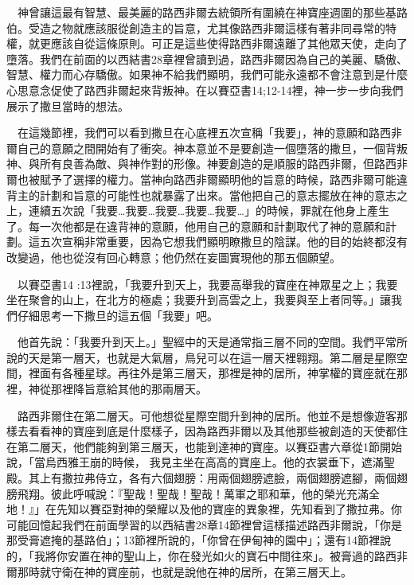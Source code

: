 \documentclass{book}
\begin{document}
\begin{center}
\noindent{}
\end{center}

　神曾讓這最有智慧、最美麗的路西非爾去統領所有圍繞在神寶座週圍的那些基路伯。受造之物就應該服從創造主的旨意，尤其像路西非爾這樣有著非同尋常的特權，就更應該自從這條原則。可正是這些使得路西非爾遠離了其他眾天使，走向了墮落。我們在前面的以西結書28章裡曾讀到過，路西非爾因為自己的美麗、驕傲、智慧、權力而心存驕傲。如果神不給我們顯明，我們可能永遠都不會注意到是什麼心思意念促使了路西非爾起來背叛神。在以賽亞書14;12-14裡，神一步一步向我們展示了撒旦當時的想法。

　在這幾節裡，我們可以看到撒旦在心底裡五次宣稱「我要」，神的意願和路西非爾自己的意願之間開始有了衝突。神本意並不是要創造一個墮落的撒旦，一個背叛神、與所有良善為敵、與神作對的形像。神要創造的是順服的路西非爾，但路西非爾也被賦予了選擇的權力。當神向路西非爾顯明他的旨意的時候，路西非爾可能違背主的計劃和旨意的可能性也就暴露了出來。當他把自己的意志擺放在神的意志之上，連續五次說「我要…我要…我要…我要…我要…」的時候，罪就在他身上產生了。每一次他都是在違背神的意願，他用自己的意願和計劃取代了神的意願和計劃。這五次宣稱非常重要，因為它想我們顯明瞭撒旦的陰謀。他的目的始終都沒有改變過，他也從沒有回心轉意；他仍然在妄圖實現他的那五個願望。

　以賽亞書14 :13裡說，「我要升到天上，我要高舉我的寶座在神眾星之上；我要坐在聚會的山上，在北方的極處；我要升到高雲之上，我要與至上者同等。」讓我們仔細思考一下撒旦的這五個「我要」吧。

　他首先說：「我要升到天上。」聖經中的天是通常指三層不同的空間。我們平常所說的天是第一層天，也就是大氣層，鳥兒可以在這一層天裡翱翔。第二層是星際空間，裡面有各種星球。再往外是第三層天，那裡是神的居所，神掌權的寶座就在那裡，神從那裡降旨意給其他的那兩層天。

　路西非爾住在第二層天。可他想從星際空間升到神的居所。他並不是想像遊客那樣去看看神的寶座到底是什麼樣子，因為路西非爾以及其他那些被創造的天使都住在第二層天，他們能夠到第三層天，也能到達神的寶座。以賽亞書六章從1節開始說，「當烏西雅王崩的時候， 我見主坐在高高的寶座上。他的衣裳垂下，遮滿聖殿。其上有撒拉弗侍立，各有六個翅膀：用兩個翅膀遮臉，兩個翅膀遮腳，兩個翅膀飛翔。彼此呼喊說：『聖哉！聖哉！聖哉！萬軍之耶和華，他的榮光充滿全地！』」在先知以賽亞對神的榮耀以及他的寶座的異象裡，先知看到了撒拉弗。你可能回憶起我們在前面學習的以西結書28章14節裡曾這樣描述路西非爾說，「你是那受膏遮掩的基路伯」；13節裡所說的，「你曾在伊甸神的園中」；還有14節裡說的，「我將你安置在神的聖山上，你在發光如火的寶石中間往來」。被膏過的路西非爾那時就守衛在神的寶座前，也就是說他在神的居所，在第三層天上。
\end{document}

